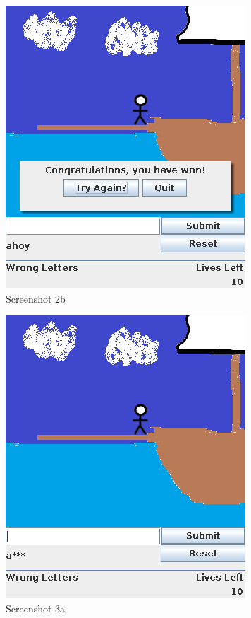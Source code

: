 \documentclass[notitlepage]{report}
\begin{document}
\begin{multicols}{2}
\begin{figure}[H]
\centering
\includegraphics[scale=0.5]{TestScreenshots/2b}
\caption{Screenshot 2b}
\end{figure}

\begin{figure}[H]
\centering
\includegraphics[scale=0.5]{TestScreenshots/3a}
\caption{Screenshot 3a}
\end{figure}


\end{multicols}
\end{document}
